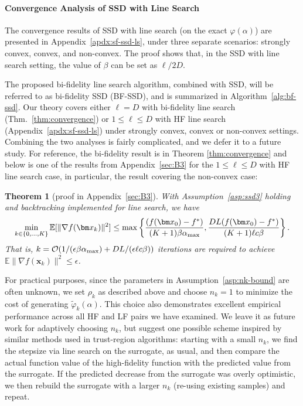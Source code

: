 \documentclass[10pt]{article} %
\numberwithin{equation}{section}
\theoremstyle{plain}
\newtheorem{theorem}{Theorem} \numberwithin{theorem}{section}
\theoremstyle{definition}
\newcommand{\<}{\langle}
\renewcommand{\>}{\rangle}
\renewcommand{\(}{\left(}
\renewcommand{\)}{\right)}
\renewcommand{\[}{\left[}
\renewcommand{\]}{\right]}
\newcommand{\alphaMax}{\alpha_\textup{max}}
\newcommand{\Lip}{L}
\newcommand{\HFSurrogate}{\tilde{\varphi}_k}
\begin{document}
\paragraph{Convergence Analysis of SSD with Line Search}
The convergence results of SSD with line search (on the exact $\varphi(\alpha)$) are presented in Appendix~\ref{apdx:sf-ssd-ls}, under three separate scenarios: strongly convex, convex, and non-convex. The proof shows that, in the SSD with line search setting, the value of $\beta$ can be set as $\ell/2D$. 

The proposed bi-fidelity line search algorithm, combined with SSD, will be referred to as bi-fidelity SSD (BF-SSD), and is summarized in Algorithm~\ref{alg:bf-ssd}. 
Our theory covers either $\ell=D$ with bi-fidelity line search (Thm.~\ref{thm:convergence}) or $1\le \ell\le D$ with HF line search (Appendix~\ref{apdx:sf-ssd-ls}) under strongly convex, convex or non-convex settings. Combining the two analyses is fairly complicated, and we defer it to a future study.  
For reference, the bi-fidelity result is in Theorem \ref{thm:convergence}
and below is one of the results from Appendix~\ref{sec:B3} for the  $1\le \ell\le D$ with HF line search case, in particular, the result covering the non-convex case:
\begin{theorem}[proof in Appendix~\ref{sec:B3}]
\label{thm:sf-nc-1}
With Assumption~\ref{asp:ssd3} holding and backtracking implemented for line search, we have
\begin{equation}
\min_{k\in\{0,\dots,K\}} \mathbb{E}[\lVert\nabla f(\bm x_k)\rVert^2] \leq \max\left\{\frac{(f(\bm x_0) - f^*)}{(K+1)\beta \alphaMax}, \frac{D\Lip (f(\bm x_0) - f^*)}{(K+1)\ell c\beta}\right\}.
\end{equation}
That is, $k=\mathcal{O}(1/(\epsilon\beta \alphaMax)+D\Lip/(\epsilon\ell c\beta))$ iterations are required to achieve $\mathbb{E}\lVert \nabla f(\bm x_k)\rVert^2\leq\epsilon$.
\end{theorem}





For practical purposes, since the parameters in Assumption~\ref{asp:nk-bound} are often unknown, we set $\rho_k$ as described above and choose $n_k = 1$ to minimize the cost of generating $\HFSurrogate(\alpha)$. This choice also demonstrates excellent empirical performance across all HF and LF pairs we have examined.
We leave it as future work for adaptively choosing $n_k$, but suggest one possible scheme inspired by similar methods used in trust-region algorithms: starting with a small $n_k$, we find the stepsize via line search on the surrogate, as usual, and then compare the actual function value of the high-fidelity function with the predicted value from the surrogate. If the predicted decrease from the surrogate was overly optimistic, we then rebuild the surrogate with a larger $n_k$ (re-using existing samples) and repeat.
\end{document}
